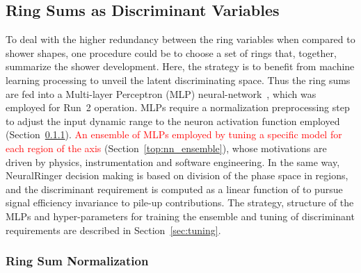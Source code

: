\subsection{Ring Sums as Discriminant Variables}\label{ssec:ringer_id}


To deal with the higher redundancy between the ring variables when compared to
shower shapes, one procedure could be to choose a set of rings that, together,
summarize the shower development. Here,  the strategy is to benefit from machine learning processing to unveil the latent discriminating space.  Thus the ring sums are fed into a Multi-layer Perceptron (MLP) neural-network~\cite{haykin_2008}, which was employed for Run~2 operation. MLPs require a normalization preprocessing
step~\cite{haykin_2008} to adjust the input dynamic range to the neuron
activation function employed (Section~\ref{top:pp}). \textcolor{red}{An ensemble of MLPs
employed by tuning a specific model for each region of the \eteta axis} (Section~\ref{top:nn_ensemble}), whose
motivations are driven by physics, instrumentation and software engineering. In the same way, NeuralRinger decision making is based
on division of the phase space in regions, and the discriminant requirement is
computed as a linear function of \avgmu to pursue signal efficiency invariance
to pile-up contributions. The strategy, structure of the MLPs and
hyper-parameters for training the ensemble and tuning of discriminant
requirements are described in Section~\ref{sec:tuning}.


%

\subsubsection{Ring Sum Normalization}\label{top:pp}


